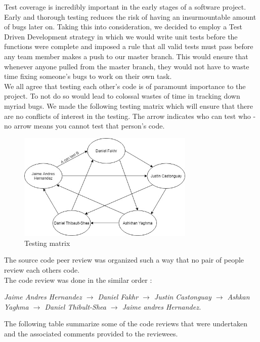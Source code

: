 \documentclass[a4paper]{article}
\begin{document}
Test coverage is incredibly important in the early stages of a software project. Early and thorough testing reduces the risk of having an insurmountable amount of bugs later on. Taking this into consideration, we decided to employ a Test Driven Development strategy in which we would write unit tests before the functions were complete and imposed a rule that all valid tests must pass before any team member makes a push to our master branch. This would ensure that whenever anyone pulled from the master branch, they would not have to waste time fixing someone's bugs to work on their own task. \\

We all agree that testing each other's code is of paramount importance to the project. To not do so would lead to colossal wastes of time in tracking down myriad bugs. We made the following testing matrix which will ensure that there are no conflicts of interest in the testing. The arrow indicates who can test who - no arrow means you cannot test that person's code.

\begin{figure}[!h]
\caption{Testing matrix}
\centering
\includegraphics[width=0.75\textwidth]{TestingMatrix}
\end{figure}

The source code peer review was organized such a way that no pair of people review each others code. \\

The code review was done in the similar order :

\medskip
\textit{Jaime Andres Hernandez $\rightarrow$ Daniel Fakhr $\rightarrow$ Justin Castonguay $\rightarrow$ Ashkan Yaghma $\rightarrow$ Daniel Thibult-Shea $\rightarrow$ Jaime andres Hernandez.}
\medskip

The following table summarize some of the code reviews that were undertaken and the associated comments provided to the reviewees.
\end{document}
